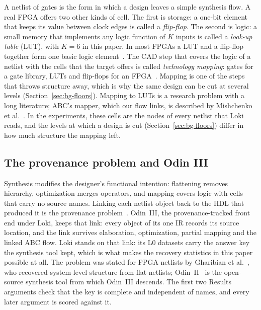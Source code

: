 \documentclass[conference]{IEEEtran}
\begin{document}
A netlist of gates is the form in which a design leaves a simple synthesis flow. A real FPGA offers two
other kinds of cell. The first is storage: a one-bit element that keeps its value between clock edges
is called a \emph{flip-flop}. %
The second is logic: a small memory that implements any logic function of $K$ inputs is called a
\emph{look-up table} (LUT), with $K=6$ in this paper. %
In most FPGAs a LUT and a flip-flop together form one basic logic element~\cite{jamiesonthesis,luuthesis}.
The CAD step that covers the logic of a netlist with the cells that the target offers is called
\emph{technology mapping}: %
gates for a gate library, LUTs and flip-flops for an FPGA~\cite{jamiesonthesis}. Mapping is one of the
steps that throws structure away, which is why the same design can be cut at several levels
(Section~\ref{sec:bg-floors}). Mapping to LUTs is a research problem with a long literature; ABC's mapper, which our flow links, is described by Mishchenko et al.~\cite{abc}. In the experiments, these cells are the nodes of every netlist that Loki reads, and the levels at which a design is cut (Section~\ref{sec:bg-floors}) differ in how much structure the mapping left.

\subsection{The provenance problem and Odin III}

Synthesis modifies the designer's functional intention: flattening removes hierarchy,
optimization merges operators, and mapping covers logic with cells that carry no source names.
Linking each netlist object back to the HDL that produced it is the provenance
problem~\cite{gharibian2010finding}. Odin~III, the provenance-tracked front end under Loki,
keeps that link: every object of its one IR records its source location, and the link
survives elaboration, optimization, partial mapping and the linked ABC flow. Loki stands on
that link: its L0 datasets carry the answer key the synthesis tool kept, which is what makes
the recovery statistics in this paper possible at all. The problem was stated for FPGA netlists by Gharibian et al.~\cite{gharibian2010finding}, who recovered system-level structure from flat netlists; Odin~II~\cite{odinII} is the open-source synthesis tool from which Odin~III descends. The first two Results arguments check that the key is complete and independent of names, and every later argument is scored against it.
\end{document}
